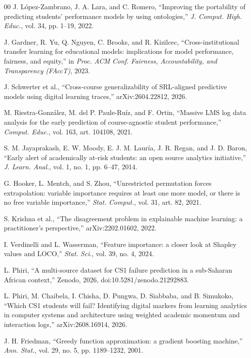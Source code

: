\documentclass[conference]{IEEEtran}
\begin{document}
\begin{thebibliography}{00}
 J. L\'opez-Zambrano, J. A. Lara, and C. Romero, ``Improving
the portability of predicting students' performance models by using ontologies,''
\emph{J. Comput. High. Educ.}, vol. 34, pp. 1--19, 2022.

 J. Gardner, R. Yu, Q. Nguyen, C. Brooks, and R. Kizilcec,
``Cross-institutional transfer learning for educational models: implications for
model performance, fairness, and equity,'' in \emph{Proc. ACM Conf. Fairness,
Accountability, and Transparency (FAccT)}, 2023.

 J. Schwerter et al., ``Cross-course generalizability of
SRL-aligned predictive models using digital learning traces,'' arXiv:2604.22812,
2026.

 M. Riestra-Gonz\'alez, M. del P. Paule-Ru\'iz, and F.
Ortin, ``Massive LMS log data analysis for the early prediction of
course-agnostic student performance,'' \emph{Comput. Educ.}, vol. 163, art.
104108, 2021.

 S. M. Jayaprakash, E. W. Moody, E. J. M. Laur\'ia, J.
R. Regan, and J. D. Baron, ``Early alert of academically at-risk students: an
open source analytics initiative,'' \emph{J. Learn. Anal.}, vol. 1, no. 1, pp.
6--47, 2014.

 G. Hooker, L. Mentch, and S. Zhou, ``Unrestricted
permutation forces extrapolation: variable importance requires at least one more
model, or there is no free variable importance,'' \emph{Stat. Comput.}, vol. 31,
art. 82, 2021.

 S. Krishna et al., ``The disagreement problem in
explainable machine learning: a practitioner's perspective,'' arXiv:2202.01602,
2022.

 I. Verdinelli and L. Wasserman, ``Feature importance: a
closer look at Shapley values and LOCO,'' \emph{Stat. Sci.}, vol. 39, no. 4,
2024.

 L. Phiri, ``A multi-source dataset for CS1 failure prediction
in a sub-Saharan African context,'' Zenodo, 2026, doi:10.5281/zenodo.21292883.

 L. Phiri, M. Chaibela, I. Chisha, D. Pungwa,
D. Siabbaba, and B. Simukoko, ``Which CS1 students will fail? Identifying digital
markers from learning analytics in computer systems and architecture using
weighted academic momentum and interaction logs,'' arXiv:2608.16914, 2026.

 J. H. Friedman, ``Greedy function approximation: a
gradient boosting machine,'' \emph{Ann. Stat.}, vol. 29, no. 5, pp. 1189--1232,
2001.


\end{thebibliography}
\end{document}
